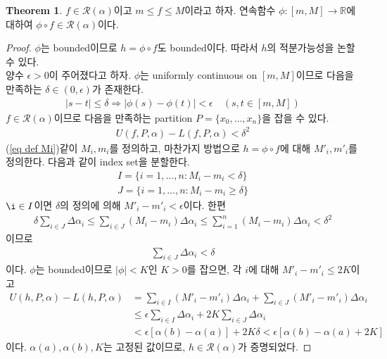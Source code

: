 \documentclass[12pt]{article}
\theoremstyle{definition}
\newtheorem{thm}{Theorem}[section]
\def\RR{\mathbb{R}}
\def\eps{\epsilon}
\def\calR{\mathcal{R}}
\newcommand{\abs}[1]{\left\vert#1\right\vert}
\begin{document}
\begin{thm}
	\(f \in \calR(\alpha)\)이고 \(m \le f \le M\)이라고 하자. 연속함수 \(\phi: [m, M] \rightarrow \RR\)에 대하여 \(\phi \circ f \in \calR(\alpha)\)이다.
\end{thm}
\begin{proof}
	\(\phi\)는 bounded이므로 \(h = \phi \circ f\)도 bounded이다. 따라서 \(h\)의 적분가능성을 논할 수 있다.\\
	양수 \(\eps > 0\)이 주어졌다고 하자. \(\phi\)는 uniformly continuous on \([m, M]\)이므로 다음을 만족하는 \(\delta \in (0, \eps)\)가 존재한다.
	\begin{gather*}
		\abs{s - t} \le \delta \Rightarrow \abs{\phi(s) - \phi(t)} < \eps \quad (s, t \in [m, M])
	\end{gather*}
	\(f \in \calR(\alpha)\)이므로 다음을 만족하는 partition \(P = \{x_0, \ldots, x_n\}\)을 잡을 수 있다.
	\begin{gather*}
		U(f, P, \alpha) - L(f, P, \alpha) < \delta^2
	\end{gather*}
	(\ref{eq def Mi})\와 같이 \(M_i, m_i\)를 정의하고, 마찬가지 방법으로 \(h = \phi \circ f\)에 대해 \(M'_i, m'_i\)를 정의한다. 다음과 같이 index set을 분할한다.
	\begin{gather*}
		I = \{i = 1, \ldots, n: M_i - m_i < \delta\}\\
		J = \{i = 1, \ldots, n: M_i - m_i \ge \delta\}
	\end{gather*}
	\(\i \in I\)이면 \(\delta\)의 정의에 의해 \(M'_i - m'_i < \eps\)이다. 한편
	\begin{gather*}
		\delta\sum_{i \in J} \Delta\alpha_i \le \sum_{i \in J} (M_i - m_i) \Delta\alpha_i \le  \sum_{i=1}^n (M_i - m_i) \Delta\alpha_i < \delta^2
	\end{gather*}
	이므로
	\begin{gather*}
		\sum_{i \in J} \Delta\alpha_i < \delta
	\end{gather*}
	이다. \(\phi\)는 bounded이므로 \(\abs{\phi} < K\)인 \(K > 0\)를 잡으면, 각 \(i\)에 대해 \(M'_i - m'_i \le 2K\)이고
	\begin{align*}
		U(h, P, \alpha) - L(h, P, \alpha) &= \sum_{i \in I} (M'_i - m'_i) \Delta\alpha_i + \sum_{i \in J} (M'_i - m'_i) \Delta\alpha_i\\
		&\le \eps \sum_{i \in I} \Delta\alpha_i + 2K \sum_{i \in J} \Delta\alpha_i \\
		&< \eps[\alpha(b) - \alpha(a)] + 2K\delta <\eps[\alpha(b) - \alpha(a) + 2K]
	\end{align*}
	이다. \(\alpha(a), \alpha(b), K\)는 고정된 값이므로, \(h \in \calR(\alpha)\)가 증명되었다.
\end{proof}
\end{document}
